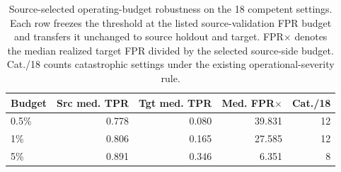 \begin{table}[htbp]
\centering
\scriptsize
\setlength{\tabcolsep}{3pt}
\caption{Source-selected operating-budget robustness on the 18 competent settings. Each row freezes the threshold at the listed source-validation FPR budget and transfers it unchanged to source holdout and target. FPR$\times$ denotes the median realized target FPR divided by the selected source-side budget. Cat./18 counts catastrophic settings under the existing operational-severity rule.}
\label{tab:acsac-budget-robustness}
\begin{tabular}{lrrrr}
\toprule
Budget & Src med. TPR & Tgt med. TPR & Med. FPR$\times$ & Cat./18 \\
\midrule
0.5\% & 0.778 & 0.080 & 39.831 & 12 \\
1\% & 0.806 & 0.165 & 27.585 & 12 \\
5\% & 0.891 & 0.346 & 6.351 & 8 \\
\bottomrule
\end{tabular}
\end{table}
